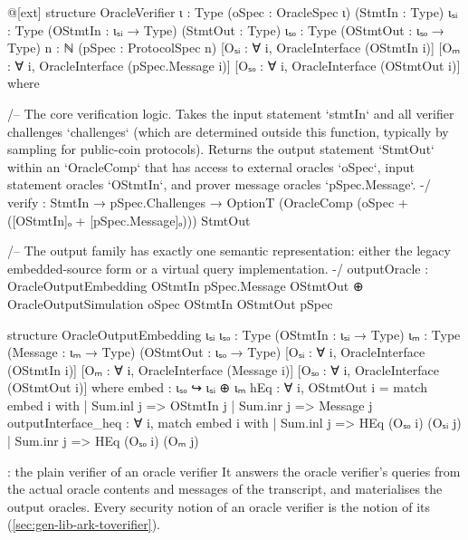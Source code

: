 \begin{leancode}
@[ext]
structure OracleVerifier {ι : Type} (oSpec : OracleSpec ι)
    (StmtIn : Type) {ιₛᵢ : Type} (OStmtIn : ιₛᵢ → Type)
    (StmtOut : Type) {ιₛₒ : Type} (OStmtOut : ιₛₒ → Type)
    {n : ℕ} (pSpec : ProtocolSpec n)
    [Oₛᵢ : ∀ i, OracleInterface (OStmtIn i)]
    [Oₘ : ∀ i, OracleInterface (pSpec.Message i)]
    [Oₛₒ : ∀ i, OracleInterface (OStmtOut i)]
    where

  /-- The core verification logic. Takes the input statement `stmtIn` and all verifier challenges
  `challenges` (which are determined outside this function, typically by sampling for
  public-coin protocols). Returns the output statement `StmtOut` within an `OracleComp` that has
  access to external oracles `oSpec`, input statement oracles `OStmtIn`, and prover message
  oracles `pSpec.Message`. -/
  verify : StmtIn → pSpec.Challenges →
    OptionT (OracleComp (oSpec + ([OStmtIn]ₒ + [pSpec.Message]ₒ))) StmtOut

  /-- The output family has exactly one semantic representation: either the
  legacy embedded-source form or a virtual query implementation. -/
  outputOracle :
    OracleOutputEmbedding OStmtIn pSpec.Message OStmtOut ⊕
      OracleOutputSimulation oSpec OStmtIn OStmtOut pSpec
\end{leancode}



\begin{leancode}
structure OracleOutputEmbedding {ιₛᵢ ιₛₒ : Type}
    (OStmtIn : ιₛᵢ → Type) {ιₘ : Type} (Message : ιₘ → Type)
    (OStmtOut : ιₛₒ → Type)
    [Oₛᵢ : ∀ i, OracleInterface (OStmtIn i)]
    [Oₘ : ∀ i, OracleInterface (Message i)]
    [Oₛₒ : ∀ i, OracleInterface (OStmtOut i)] where
  embed : ιₛₒ ↪ ιₛᵢ ⊕ ιₘ
  hEq : ∀ i, OStmtOut i = match embed i with
    | Sum.inl j => OStmtIn j
    | Sum.inr j => Message j
  outputInterface_heq : ∀ i, match embed i with
    | Sum.inl j => HEq (Oₛₒ i) (Oₛᵢ j)
    | Sum.inr j => HEq (Oₛₒ i) (Oₘ j)
\end{leancode}


\begin{define}{: the plain verifier of an oracle verifier}
It answers the oracle verifier's queries from the actual oracle contents and messages of the
transcript, and materialises the output oracles. Every security notion of an oracle verifier is
the notion of its  (\cref{sec:gen-lib-ark-toverifier}).
\end{define}

